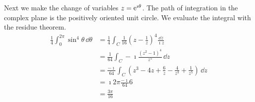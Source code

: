 {\begin{Solution}
\begin{enumerate}
\[    \]
    Next we make the change of variables $z = \mathop{\mathrm{e}}\nolimits^{\imath \theta}$.
    The path of integration in the complex plane is the positively oriented
    unit circle.  We evaluate the integral with the residue theorem.
    \begin{align*}
      \frac{1}{4} \int_0^{2 \pi} \sin^4 \theta\,\dd \theta
      &= \frac{1}{4} \int_C \frac{1}{16}
      \left( z - \frac{1}{z} \right)^4 \frac{\dd z}{\imath z}
      \\
      &= \frac{1}{64} \int_C - \imath \frac{ (z^2 - 1)^4 }{ z^5 } \,\dd z
      \\
      &= \frac{- \imath}{64} \int_C \left( z^3 - 4 z + \frac{6}{z} - \frac{4}{z^3} 
        + \frac{1}{z^5} \right) \,\dd z
      \\
      &= \imath 2 \pi \frac{- \imath}{64} 6
      \\
      &= \frac{3 \pi}{16}
    \end{align*}
    
  \end{enumerate}
\end{Solution}








}
